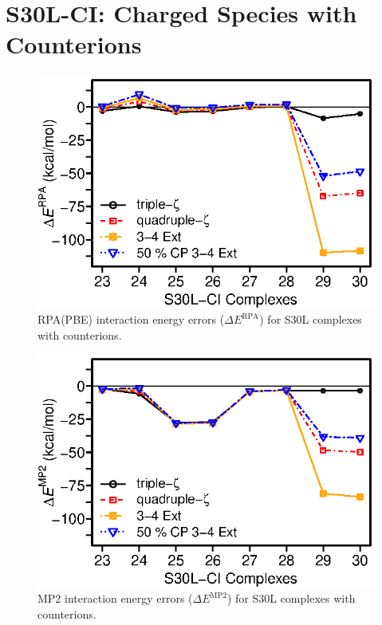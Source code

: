 \documentclass[journal=jctcce,manuscript=article]{achemso}
\begin{document}
\section{S30L-CI: Charged Species with Counterions}

\begin{figure}[H]
  \centering
  \includegraphics{s30l-ci.eps}
  \caption{RPA(PBE) interaction energy errors ($\Delta E^{\text{RPA}}$)
    for S30L complexes with 
    counterions\cite{Sure15JChemTheoryComput}.}
  \label{fig:s30cirpa}
\end{figure}

\begin{figure}[H]
  \centering
  \includegraphics{mp2-ci.eps}
  \caption{MP2 interaction energy errors ($\Delta E^{\text{MP2}}$) for S30L complexes with
    counterions\cite{Sure15JChemTheoryComput}.}
  \label{fig:s30cimp2}
\end{figure}
\end{document}
